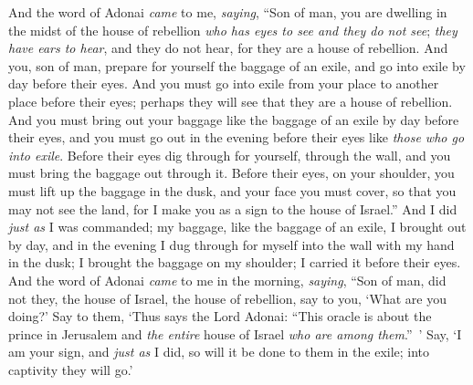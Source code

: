\begin{biblechapter} %
 And the word of Adonai \textit{came} to me, \textit{saying},
\verse “Son of man, you are dwelling in the midst of the house of rebellion \textit{who has eyes to see and they do not see}; \textit{they have ears to hear}, and they do not hear, for they are a house of rebellion.
\verse And you, son of man, prepare for yourself the baggage of an exile, and go into exile by day before their eyes. And you must go into exile from your place to another place before their eyes; perhaps they will see that they are a house of rebellion.
\verse And you must bring out your baggage like the baggage of an exile by day before their eyes, and you must go out in the evening before their eyes like \textit{those who go into exile}.
\verse Before their eyes dig through for yourself, through the wall, and you must bring the baggage out through it.
\verse Before their eyes, on your shoulder, you must lift up the baggage in the dusk, and your face you must cover, so that you may not see the land, for I make you as a sign to the house of Israel.”
\verse And I did \textit{just as} I was commanded; my baggage, like the baggage of an exile, I brought out by day, and in the evening I dug through for myself into the wall with my hand in the dusk; I brought the baggage on my shoulder; I carried it before their eyes.
\verse And the word of Adonai \textit{came} to me in the morning, \textit{saying},
\verse “Son of man, did not they, the house of Israel, the house of rebellion, say to you, ‘What are you doing?’
\verse Say to them, ‘Thus says the Lord Adonai: “This oracle is about the prince in Jerusalem and \textit{the entire} house of Israel \textit{who are among them}.” ’
\verse Say, ‘I am your sign, and \textit{just as} I did, so will it be done to them in the exile; into captivity they will go.’

\end{biblechapter}
